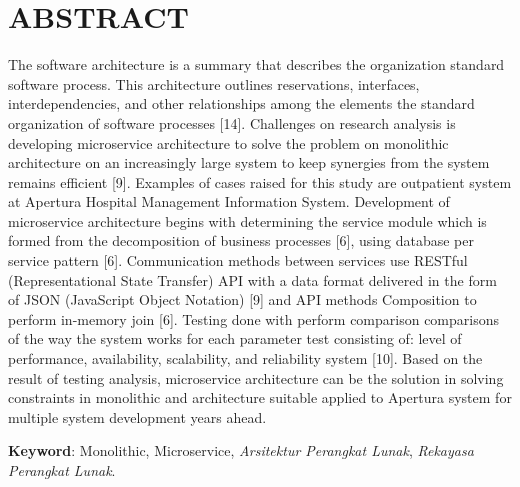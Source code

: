 \chapter*{ABSTRACT}
\noindent The software architecture is a summary that describes the organization standard software process. This architecture outlines reservations, interfaces, interdependencies, and other relationships among the elements the standard organization of software processes [14]. Challenges on research analysis is developing microservice architecture to solve the problem on monolithic architecture on an increasingly large system to keep synergies from the system remains efficient [9]. Examples of cases raised for this study are outpatient system at Apertura Hospital Management Information System. Development of microservice architecture begins with determining the service module which is formed from the decomposition of business processes [6], using database per service pattern [6]. Communication methods between services use RESTful (Representational State Transfer) API with a data format delivered in the form of JSON (JavaScript Object Notation) [9] and API methods Composition to perform in-memory join [6]. Testing done with perform comparison comparisons of the way the system works for each parameter test consisting of: level of performance, availability, scalability, and reliability system [10]. Based on the result of testing analysis, microservice architecture can be the solution in solving constraints in monolithic and architecture suitable applied to Apertura system for multiple system development years ahead.

\noindent\textbf{Keyword}: Monolithic, Microservice, \textit{Arsitektur Perangkat Lunak}, \textit{Rekayasa Perangkat Lunak}.